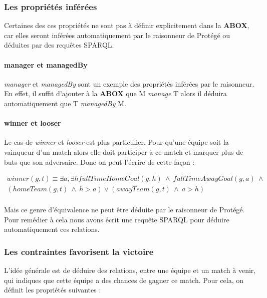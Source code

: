 \documentclass[oneside,13pt,a4paper]{article}
\begin{document}
\subsubsection{Les propriétés inférées}

Certaines des ces propriétés ne sont pas à définir explicitement dans la \textbf{ABOX}, car elles seront inférées automatiquement par le raisonneur de Protégé ou déduites par des requêtes SPARQL.

\paragraph{manager et managedBy}

\textit{manager} et \textit{managedBy} sont un exemple des propriétés inférées par le raisonneur. En effet, il suffit d'ajouter à la \textbf{ABOX} que M \textit{manage} T alors il déduira automatiquement que T \textit{managedBy} M.

\paragraph{winner et looser}

Le cas de \textit{winner} et \textit{looser} est plus particulier. Pour qu’une équipe soit la vainqueur d’un match alors elle doit participer à ce match et marquer plus de buts que son adversaire. Donc on peut l’écrire de cette façon :

\begin{multline*}
winner(g,t) \equiv \exists a,\exists h  fullTimeHomeGoal(g,h) \ \wedge \ fullTimeAwayGoal(g, a) \ \wedge \ \\
  (homeTeam(g,t) \ \wedge \ h > a)  \vee (awayTeam(g,t) \ \wedge \  a > h) \\
\end{multline*}

Mais ce genre d'équivalence ne peut être déduite par le raisonneur de Protégé. Pour remédier à cela nous avons écrit une requête SPARQL pour déduire automatiquement ces relations.



\subsubsection{Les contraintes favorisent la victoire}

L'idée générale est de déduire des relations, entre une équipe et un match à venir, qui indiques que cette équipe a des chances de gagner ce match. Pour cela, on définit les propriétés suivantes : 
\end{document}
